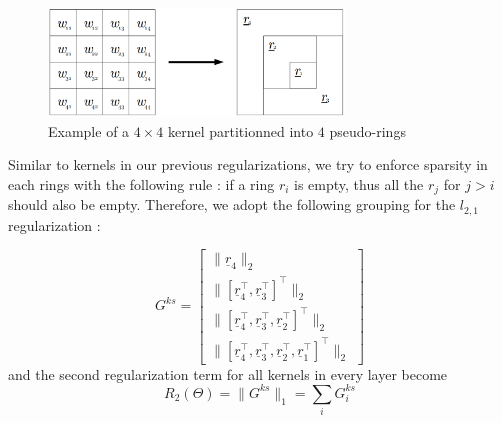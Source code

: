 \documentclass{winnower}
\begin{document}
\begin{figure}[h!]
\centering
\includegraphics[width=0.7\textwidth]{pic/kernel_split.png}
\caption{Example of a $4 \times 4$ kernel partitionned into $4$ pseudo-rings}
\label{fig:kernel-rings}
\end{figure}

Similar to kernels in our previous regularizations, we try to enforce sparsity in each rings with the following rule : if a ring $r_i$ is empty, thus all the $r_j$ for $j > i$ should also be empty. Therefore, we adopt the following grouping for the $l_{2,1}$ regularization :

\[
G^{ks} =  
\begin{bmatrix}
	\|\underline{r}_4 \|_2 \\
	\|\left[\underline{r}_4^\top, \underline{r}_3^\top \right]^\top \|_2 \\
	\|\left[\underline{r}_4^\top, \underline{r}_3^\top, \underline{r}_2^\top \right]^\top\|_2 \\
	\|\left[\underline{r}_4^\top, \underline{r}_3^\top, \underline{r}_2^\top, \underline{r}_1^\top \right]^\top\|_2
\end{bmatrix}
\]
and the second regularization term for all kernels in every layer become 
\[
R_2(\Theta) = \| G^{ks} \|_1 = \sum_i G^{ks}_i
\]
\end{document}
